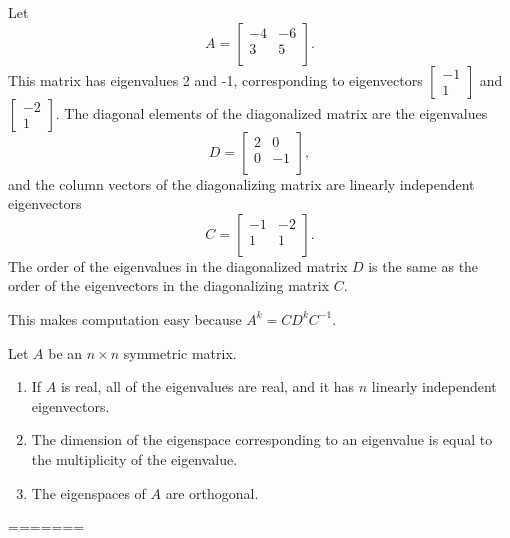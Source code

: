\documentclass{article}
\begin{document}
    Let
    \[
    A = 
    \begin{bmatrix}
        -4 & -6 \\
        3 & 5 \\
    \end{bmatrix}.
    \]
    This matrix has eigenvalues 2 and -1, 
    corresponding to eigenvectors $\begin{bmatrix} -1 \\ 1 \end{bmatrix}$ and $\begin{bmatrix} -2 \\ 1 \end{bmatrix}$. 
    The diagonal elements of the diagonalized matrix are the eigenvalues
    \[
    D = 
    \begin{bmatrix}
        2 & 0 \\
        0 & -1 \\
    \end{bmatrix},
    \]
    and the column vectors of the diagonalizing matrix are linearly independent eigenvectors
    \[
    C = 
    \begin{bmatrix}
        -1 & -2 \\
        1 & 1 \\
    \end{bmatrix}.
    \]
    The order of the eigenvalues in the diagonalized matrix $D$
    is the same as the order of the eigenvectors in the diagonalizing matrix $C$.

    This makes computation easy because $A^k = CD^kC^{-1}$. 

    Let $A$ be an $n \times n$ symmetric matrix. 
    \begin{enumerate}
        \item If $A$ is real, all of the eigenvalues are real, and it has $n$ linearly independent eigenvectors.
        \item The dimension of the eigenspace corresponding to an eigenvalue is equal to the multiplicity of the eigenvalue.
        \item The eigenspaces of $A$ are orthogonal. 
    \end{enumerate}

=======
\end{document}
